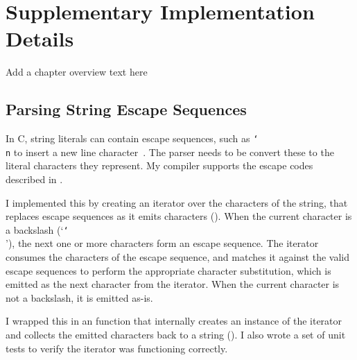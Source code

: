 \documentclass[../00-main.tex]{subfiles}
\begin{document}
\chapter{Supplementary Implementation Details}

\begin{mrwComment}
Add a chapter overview text here
\end{mrwComment}

\section{Parsing String Escape Sequences}\label{app:sec:parsing string escape sequences}

In C, string literals can contain escape sequences, such as \texttt{\char`\\n} to insert a new line character~.
The parser needs to be convert these to the literal characters they represent.
My compiler supports the escape codes described in .

I implemented this by creating an iterator over the characters of the string, that replaces escape sequences as it emits characters ().
When the current character is a backslash (`\texttt{\char`\\}'), the next one or more characters form an escape sequence.
The iterator consumes the characters of the escape sequence, and matches it against the valid escape sequences to perform the appropriate character substitution, which is emitted as the next character from the iterator.
When the current character is not a backslash, it is emitted as-is.

I wrapped this in an  function that internally creates an instance of the iterator and collects the emitted characters back to a string ().
I also wrote a set of unit tests to verify the iterator was functioning correctly.
\end{document}
